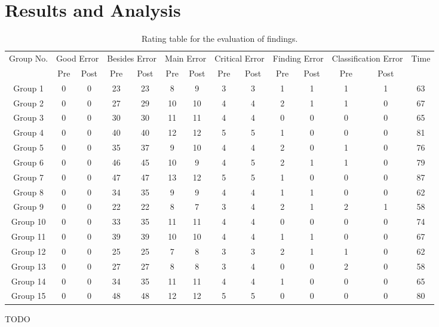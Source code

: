 \section{Results and Analysis}

\begin{table*}[t]
\centering
\begin{tabular}{c|ccccccccccccc}
  Group No. &  \multicolumn{2}{r}{Good Error} & \multicolumn{2}{r}{Besides Error} & \multicolumn{2}{r}{Main Error} & \multicolumn{2}{r}{Critical Error} & \multicolumn{2}{r}{Finding Error} & \multicolumn{2}{r}{Classification Error} & Time\\
  & Pre & Post & Pre & Post & Pre & Post & Pre & Post & Pre & Post & Pre & Post & \\
  \hline
  Group 1 &0&0&23&23&8&9&3&3&1&1&1&1&63 \\
  Group 2 &0&0&27&29&10&10&4&4&2&1&1&0&67 \\
  Group 3 &0&0&30&30&11&11&4&4&0&0&0&0&65 \\
  Group 4 &0&0&40&40&12&12&5&5&1&0&0&0&81 \\
  Group 5 &0&0&35&37&9&10&4&4&2&0&1&0&76 \\
  Group 6 &0&0&46&45&10&9&4&5&2&1&1&0&79 \\
  Group 7 &0&0&47&47&13&12&5&5&1&0&0&0&87 \\
  Group 8 &0&0&34&35&9&9&4&4&1&1&0&0&62 \\
  Group 9 &0&0&22&22&8&7&3&4&2&1&2&1&58 \\
  Group 10 &0&0&33&35&11&11&4&4&0&0&0&0&74 \\
  Group 11 &0&0&39&39&10&10&4&4&1&1&0&0&67 \\
  Group 12 &0&0&25&25&7&8&3&3&2&1&1&0&62 \\
  Group 13 &0&0&27&27&8&8&3&4&0&0&2&0&58 \\
  Group 14 &0&0&34&35&11&11&4&4&1&0&0&0&65 \\
  Group 15 &0&0&48&48&12&12&5&5&0&0&0&0&80 \\
\end{tabular}
\caption{Rating table for the evaluation of findings.}
\label{tab:ratings}
\end{table*}

TODO